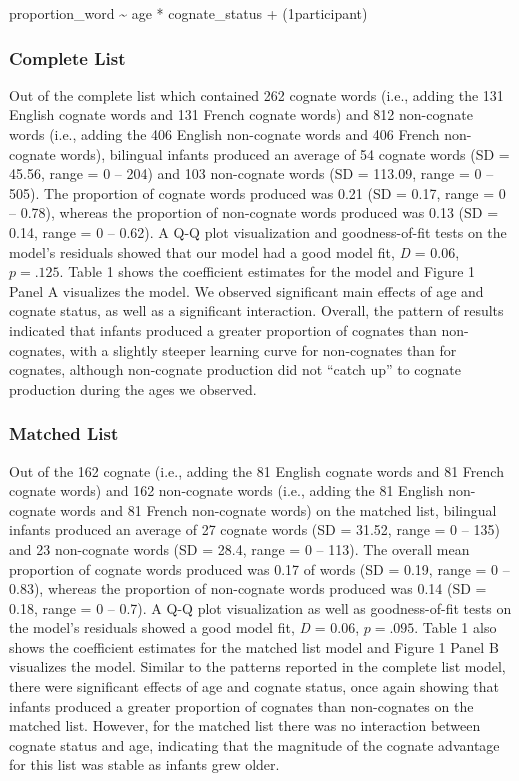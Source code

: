 \documentclass[
  ,man,floatsintext]{apa6}
\begin{document}
proportion\_word \textasciitilde{} age * cognate\_status + (1\textbar participant)

\hypertarget{complete-list}{%
\subsubsection{Complete List}\label{complete-list}}

Out of the complete list which contained 262 cognate words (i.e., adding the 131 English cognate words and 131 French cognate words) and 812 non-cognate words (i.e., adding the 406 English non-cognate words and 406 French non-cognate words), bilingual infants produced an average of 54 cognate words (SD = 45.56, range = 0 -- 204) and 103 non-cognate words (SD = 113.09, range = 0 -- 505). The proportion of cognate words produced was 0.21 (SD = 0.17, range = 0 -- 0.78), whereas the proportion of non-cognate words produced was 0.13 (SD = 0.14, range = 0 -- 0.62). A Q-Q plot visualization and goodness-of-fit tests on the model's residuals showed that our model had a good model fit, \emph{D} = 0.06, \(p = .125\). Table 1 shows the coefficient estimates for the model and Figure 1 Panel A visualizes the model. We observed significant main effects of age and cognate status, as well as a significant interaction. Overall, the pattern of results indicated that infants produced a greater proportion of cognates than non-cognates, with a slightly steeper learning curve for non-cognates than for cognates, although non-cognate production did not ``catch up'' to cognate production during the ages we observed.

\hypertarget{matched-list}{%
\subsubsection{Matched List}\label{matched-list}}

Out of the 162 cognate (i.e., adding the 81 English cognate words and 81 French cognate words) and 162 non-cognate words (i.e., adding the 81 English non-cognate words and 81 French non-cognate words) on the matched list, bilingual infants produced an average of 27 cognate words (SD = 31.52, range = 0 -- 135) and 23 non-cognate words (SD = 28.4, range = 0 -- 113). The overall mean proportion of cognate words produced was 0.17 of words (SD = 0.19, range = 0 -- 0.83), whereas the proportion of non-cognate words produced was 0.14 (SD = 0.18, range = 0 -- 0.7). A Q-Q plot visualization as well as goodness-of-fit tests on the model's residuals showed a good model fit, \emph{D} = 0.06, \(p = .095\). Table 1 also shows the coefficient estimates for the matched list model and Figure 1 Panel B visualizes the model. Similar to the patterns reported in the complete list model, there were significant effects of age and cognate status, once again showing that infants produced a greater proportion of cognates than non-cognates on the matched list. However, for the matched list there was no interaction between cognate status and age, indicating that the magnitude of the cognate advantage for this list was stable as infants grew older.
\end{document}
